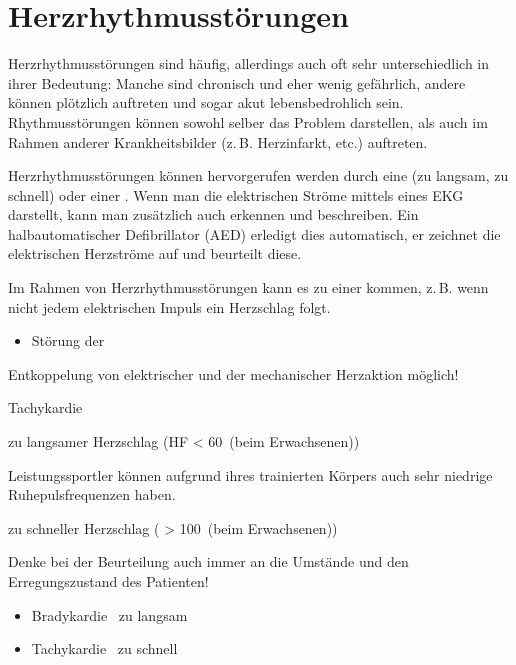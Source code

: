 \section{Herzrhythmusstörungen}
\label{topic:herzrhythmusstoerungen}

Herzrhythmusstörungen sind häufig, allerdings auch oft sehr
unterschiedlich in ihrer Bedeutung: Manche sind chronisch
und eher wenig gefährlich, andere können plötzlich auftreten
und sogar akut lebensbedrohlich sein. Rhythmusstörungen
können sowohl selber das Problem darstellen, als auch  im Rahmen anderer Krankheitsbilder (z.\,B.
Herzinfarkt, etc.) auftreten.

{%
Herzrhythmusstörungen können hervorgerufen werden durch eine
 (zu langsam, zu schnell) oder
einer . Wenn man die
elektrischen Ströme mittels eines EKG darstellt, kann man
zusätzlich auch  erkennen und beschreiben. Ein halbautomatischer
Defibrillator (AED) erledigt dies automatisch, er zeichnet
die elektrischen Herzströme auf und beurteilt diese.

Im Rahmen von Herzrhythmusstörungen kann es zu einer
 kommen, z.\,B. wenn nicht jedem elektrischen
Impuls ein Herzschlag folgt.
}{
\begin{itemize}
  \item Störung der
\end{itemize}

Entkoppelung von elektrischer und der mechanischer Herzaktion möglich!
}{}{}{}

{%
%
\begin{labeling}[~--]{Tachykardie}
  \item[\T{Bradykardie}]  zu langsamer Herzschlag
  ({HF \textless} 60\,\nicefrac{}{\Min} {\tiny (beim Erwachsenen)})
  
  Leistungssportler können aufgrund ihres trainierten Körpers auch sehr
  niedrige Ruhepulsfrequenzen haben.
  \item[\T{Tachykardie}]  zu schneller
  Herzschlag
  ( {\textgreater} 100\,\nicefrac{}{\Min} {\tiny
  (beim Erwachsenen)})
\end{labeling}

Denke bei der Beurteilung auch immer an die Umstände und den
Erregungszustand des Patienten!
}{
\begin{itemize}
  \item Bradykardie \dotfill\ zu langsam
  \item Tachykardie \dotfill\ zu schnell
\end{itemize}
}{}{}{}

